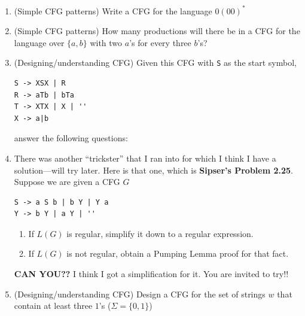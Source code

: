 \documentclass[12pt]{article}
\begin{document}
\begin{large}
\begin{enumerate}
\item (Simple CFG patterns)
  Write a CFG for the language $0(00)^*$


\item (Simple CFG patterns)
  How many productions will there be in a CFG for the language over $\{a,b\}$
  with two $a$'s for every three $b$'s?


\item (Designing/understanding CFG)
  Given this CFG with {\tt S} as the start symbol,
\begin{verbatim}
S -> XSX | R
R -> aTb | bTa
T -> XTX | X | ''
X -> a|b
\end{verbatim}
  answer the following questions:

\item There was another ``trickster'' that I ran into for which I think
  I have a solution---will try later. Here is that one, which is
  {\bf Sipser's Problem 2.25}.
Suppose we are given a CFG $G$

\begin{verbatim}
S -> a S b | b Y | Y a
Y -> b Y | a Y | ''
\end{verbatim}

\begin{enumerate}
\item If $L(G)$ is regular, simplify it down to a regular expression.
\item If $L(G)$ is not regular, obtain a Pumping Lemma proof for that fact.
\end{enumerate}
{\bf CAN YOU??} I think I got a simplification for it.
  You are invited to try!!


\item (Designing/understanding CFG)  Design a CFG for the set of
  strings $w$ that contain at least three $1$'s ($\Sigma=\{0,1\}$)


\end{enumerate}
\end{large}
\end{document}
